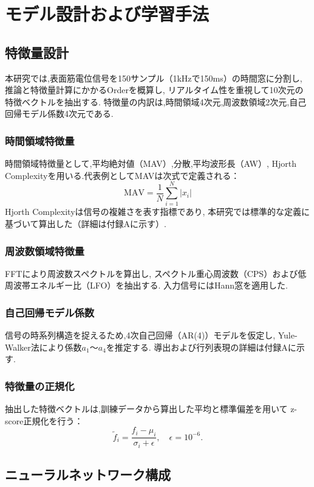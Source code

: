 \chapter{モデル設計および学習手法}

\section{特徴量設計}
本研究では,表面筋電位信号を150サンプル（1kHzで150ms）の時間窓に分割し,
推論と特徴量計算にかかるOrderを概算し, リアルタイム性を重視して10次元の特徴ベクトルを抽出する.
特徴量の内訳は,時間領域4次元,周波数領域2次元,自己回帰モデル係数4次元である.

\subsection{時間領域特徴量}
時間領域特徴量として,平均絶対値（MAV）,分散,平均波形長（AW）,
Hjorth Complexityを用いる.代表例としてMAVは次式で定義される：
\begin{equation}
\mathrm{MAV} = \frac{1}{N}\sum_{i=1}^{N}|x_i|
\end{equation}
Hjorth Complexityは信号の複雑さを表す指標であり,
本研究では標準的な定義に基づいて算出した（詳細は付録Aに示す）.

\subsection{周波数領域特徴量}
FFTにより周波数スペクトルを算出し,
スペクトル重心周波数（CPS）および低周波帯エネルギー比（LFO）を抽出する.
入力信号にはHann窓を適用した.

\subsection{自己回帰モデル係数}
信号の時系列構造を捉えるため,4次自己回帰（AR(4)）モデルを仮定し,
Yule-Walker法により係数$a_1$～$a_4$を推定する.
導出および行列表現の詳細は付録Aに示す.

\subsection{特徴量の正規化}
抽出した特徴ベクトルは,訓練データから算出した平均と標準偏差を用いて
z-score正規化を行う：
\begin{equation}
\tilde{f}_i = \frac{f_i - \mu_i}{\sigma_i + \epsilon}, \quad \epsilon = 10^{-6}.
\end{equation}

\section{ニューラルネットワーク構成}

